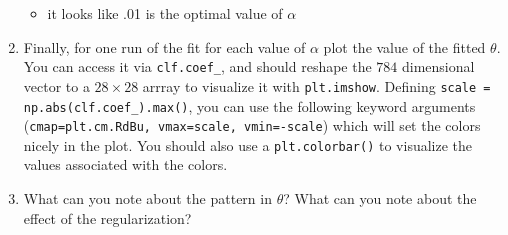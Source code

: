 \documentclass{article}
\begin{document}
\begin{enumerate}
  \begin{itemize}
      \item it looks like .01 is the optimal value of  $\alpha$
  \end{itemize}

  \item Finally, for one run of the fit for each value of $\alpha$ plot the value of the fitted $\theta$. You can access it via \texttt{clf.coef\_}, and should reshape the $784$ dimensional vector to a $28\times 28$ arrray to visualize it with \texttt{plt.imshow}. Defining \texttt{scale = np.abs(clf.coef\_).max()}, you can use the following keyword arguments (\texttt{cmap=plt.cm.RdBu, vmax=scale, vmin=-scale}) which will set the colors nicely in the plot. You should also use a \texttt{plt.colorbar()} to visualize the values associated with the colors.
  
  \item What can you note about the pattern in $\theta$? What can you note about the effect of the regularization?


\end{enumerate}
\end{document}
